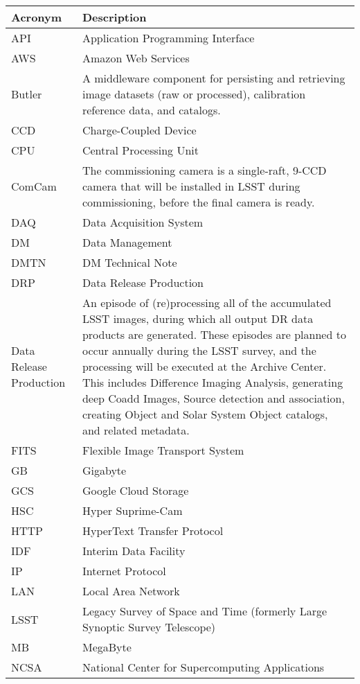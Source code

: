 \addtocounter{table}{-1}
\begin{longtable}{|p{}|p{}|}\hline
\textbf{Acronym} & \textbf{Description}  \\\hline

API & Application Programming Interface \\\hline
AWS & Amazon Web Services \\\hline
Butler & A middleware component for persisting and retrieving image datasets (raw or processed), calibration reference data, and catalogs. \\\hline
CCD & Charge-Coupled Device \\\hline
CPU & Central Processing Unit \\\hline
ComCam & The commissioning camera is a single-raft, 9-CCD camera that will be installed in LSST during commissioning, before the final camera is ready. \\\hline
DAQ & Data Acquisition System \\\hline
DM & Data Management \\\hline
DMTN & DM Technical Note \\\hline
DRP & Data Release Production \\\hline
Data Release Production & An episode of (re)processing all of the accumulated LSST images, during which all output DR data products are generated. These episodes are planned to occur annually during the LSST survey, and the processing will be executed at the Archive Center. This includes Difference Imaging Analysis, generating deep Coadd Images, Source detection and association, creating Object and Solar System Object catalogs, and related metadata. \\\hline
FITS & Flexible Image Transport System \\\hline
GB & Gigabyte \\\hline
GCS & Google Cloud Storage \\\hline
HSC & Hyper Suprime-Cam \\\hline
HTTP & HyperText Transfer Protocol \\\hline
IDF & Interim Data Facility \\\hline
IP & Internet Protocol \\\hline
LAN & Local Area Network \\\hline
LSST & Legacy Survey of Space and Time (formerly Large Synoptic Survey Telescope) \\\hline
MB & MegaByte \\\hline
NCSA & National Center for Supercomputing Applications \\\hline

\end{longtable}
